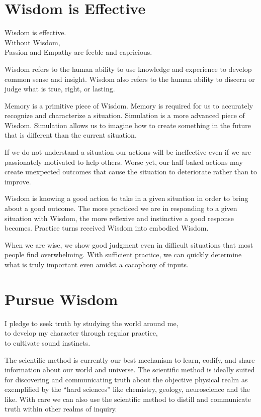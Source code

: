 \documentclass[ebook,12pt,openany,twoside]{memoir}
\newcommand{\tab}{\hspace*{2em}}
\newcommand{\imagefacingchapter}[1]{
  \cleartoverso
  \clearpage \null
  \thispagestyle{cleared}
  \AddToShipoutPictureBG*{%
    \AtStockLowerLeft{%
      \texttt{[image: \#1]}
    }
  }
  \clearpage
}
\begin{document}
\chapter{Wisdom is Effective}

\setlength\epigraphwidth{3.5in}
\epigraph{
  Wisdom is effective.\\
  Without Wisdom,\\
  \tab Passion and Empathy are feeble and capricious.
}{}

Wisdom refers to the human ability to use knowledge and experience to develop
common sense and insight. Wisdom also refers to the human ability to discern or
judge what is true, right, or lasting.

Memory is a primitive piece of Wisdom. Memory is required for us to accurately
recognize and characterize a situation. Simulation is a more advanced piece of
Wisdom. Simulation allows us to imagine how to create something in the future
that is different than the current situation.

If we do not understand a situation our actions will be ineffective even if we
are passionately motivated to help others. Worse yet, our half-baked actions
may create unexpected outcomes that cause the situation to deteriorate rather
than to improve.

Wisdom is knowing a good action to take in a given situation in order to bring
about a good outcome. The more practiced we are in responding to a given
situation with Wisdom, the more reflexive and instinctive a good response
becomes.  Practice turns received Wisdom into embodied Wisdom.

When we are wise, we show good judgment even in difficult situations that most
people find overwhelming. With sufficient practice, we can quickly determine
what is truly important even amidst a cacophony of inputs.




\imagefacingchapter{images/PursueWisdom}
\chapter{Pursue Wisdom}
\setlength\epigraphwidth{3.8in}
\epigraph{
  I pledge to seek truth by studying the world around me,\\
  to develop my character through regular practice,\\
  to cultivate sound instincts.
}{}

\noindent The scientific method is currently our best mechanism to learn,
codify, and share information about our world and universe. The scientific
method is ideally suited for discovering and communicating truth about the
objective physical realm as exemplified by the ``hard sciences'' like
chemistry, geology, neuroscience and the like. With care we can also use the
scientific method to distill and communicate truth within other realms of
inquiry.
\end{document}
